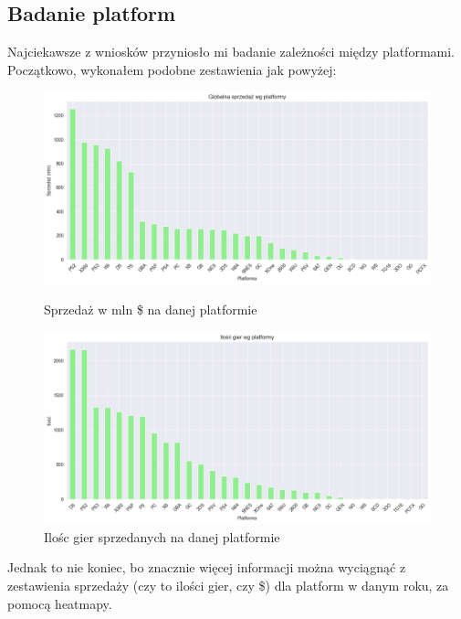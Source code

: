 \documentclass[11pt]{article}
\begin{document}
\subsection{Badanie platform}\label{subsec:badanie-platform}
Najciekawsze z wniosków przyniosło mi badanie zależności między platformami.
Początkowo, wykonałem podobne zestawienia jak powyżej:

\begin{figure}[H]
    \centering
    \begin{minipage}[t]{0.48\linewidth}
        \centering
        \includegraphics[width=\linewidth]{figures/platforma-sprzedaz}
        \caption{Sprzedaż w mln \$ na danej platformie}
        \label{fig:platform}
    \end{minipage}
    \hfill
    \begin{minipage}[t]{0.48\linewidth}
        \centering
        \includegraphics[width=\linewidth]{figures/platforma-ilosc}
        \caption{Ilośc gier sprzedanych na danej platformie}
        \label{fig:platform2}
    \end{minipage}
\end{figure}

Jednak to nie koniec, bo znacznie więcej informacji można wyciągnąć z zestawienia sprzedaży (czy to ilości gier, czy \$) dla platform w danym roku, za pomocą heatmapy.
\end{document}
